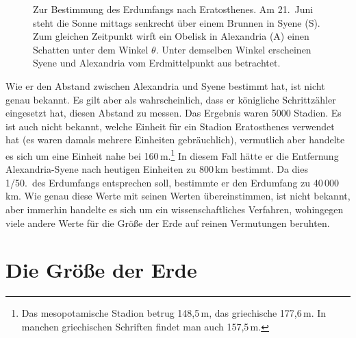 \begin{SCfigure}[30][htb]
\caption{\label{fig_Erat}%
Zur Bestimmung des Erdumfangs nach Eratosthenes. Am 21.\ Juni steht die Sonne
mittags senkrecht \"uber einem Brunnen in Syene (S). Zum gleichen Zeitpunkt wirft ein
Obelisk in Alexandria (A) einen Schatten unter dem Winkel $\theta$. Unter demselben
Winkel erscheinen Syene und Alexandria vom Erdmittelpunkt aus betrachtet.}
\end{SCfigure}  

Wie er den Abstand zwischen Alexandria und Syene bestimmt hat, ist nicht genau bekannt. Es gilt aber als wahrscheinlich,
dass er k\"onigliche Schrittz\"ahler eingesetzt hat, diesen Abstand zu messen. Das Ergebnis
waren 5000 Stadien. Es ist auch nicht bekannt, welche Einheit f\"ur ein Stadion Eratosthenes
verwendet hat (es waren damals mehrere Einheiten gebr\"auchlich), vermutlich aber handelte
es sich um eine Einheit nahe bei 160\,m.\footnote{Das mesopotamische Stadion betrug 148,5\,m, das
griechische 177,6\,m. In manchen griechischen Schriften findet man auch 157,5\,m.} 
In diesem Fall h\"atte er die Entfernung Alexandria-Syene 
nach heutigen Einheiten zu 800\,km bestimmt. Da dies 1/50.\ des Erdumfangs entsprechen
soll, bestimmte er den Erdumfang zu 40\,000\,km. Wie genau diese Werte mit seinen Werten
\"ubereinstimmen, ist nicht bekannt, aber immerhin handelte es sich um ein wissenschaftliches
Verfahren, wohingegen viele andere Werte f\"ur die Gr\"o\ss e der Erde auf reinen Vermutungen beruhten. 

\section{Die Gr\"o\ss e der Erde}

